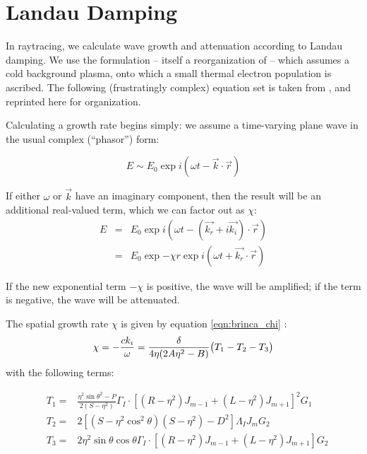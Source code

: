 \section{Landau Damping}
\label{appendix:landau}

In raytracing, we calculate wave growth and attenuation according to Landau damping. We use the \citet{Brinca1972} formulation -- itself a reorganization of \cite{Kennel1966} -- which assumes a cold background plasma, onto which a small thermal electron population is ascribed. The following (frustratingly complex) equation set is taken from \cite{Brinca1972}, and reprinted here for organization.

Calculating a growth rate begins simply: we assume a time-varying plane wave in the usual complex (``phasor'') form:

\begin{equation}
E \sim E_0 \exp{i(\omega t - \vec{k}\cdot\vec{r})}
\end{equation}

If either $\omega$ or $\vec{k}$ have an imaginary component, then the result will be an additional real-valued term, which we can factor out as $\chi$:
\begin{eqnarray}
E & = &E_0 \exp{i( \omega t - (\vec{k_r} + i\vec{k_i})\cdot\vec{r})} \\
& = &E_0 \exp{-\chi r}\exp{i(\omega t + \vec{k_r}\cdot\vec{r})}
\end{eqnarray}

If the new exponential term $-\chi$ is positive, the wave will be amplified; if the term is negative, the wave will be attenuated.

The spatial growth rate $\chi$ is given by equation \ref{eqn:brinca_chi} \citep{Brinca1972,Kennel1966}:
\begin{equation}
\chi = -\frac{c k_i}{\omega} = \frac{\delta}{4 \eta (2 A \eta^2 - B)} \big( T_1 - T_2 - T_3 \big) \\ \label{eqn:brinca_chi} 
\end{equation}
with the following terms:

\begin{eqnarray}
&T_1 = & \frac{\eta^2\sin{\theta}^2 - P}{2(S - \eta^2)}\Gamma_I \cdot [(R - \eta^2)J_{m-1} + (L - \eta^2)J_{m+1}]^2 G_1 \\ \nonumber
&T_2 = & 2[(S - \eta^2 \cos^2\theta)(S - \eta^2) - D^2] \Lambda_I J_m G_2 \\ \nonumber
&T_3 = & 2\eta^2 \sin \theta \cos \theta \Gamma_I\cdot [(R - \eta^2)J_{m-1} + (L - \eta^2)J_{m+1}]G_2 \\ \nonumber
\end{eqnarray}

